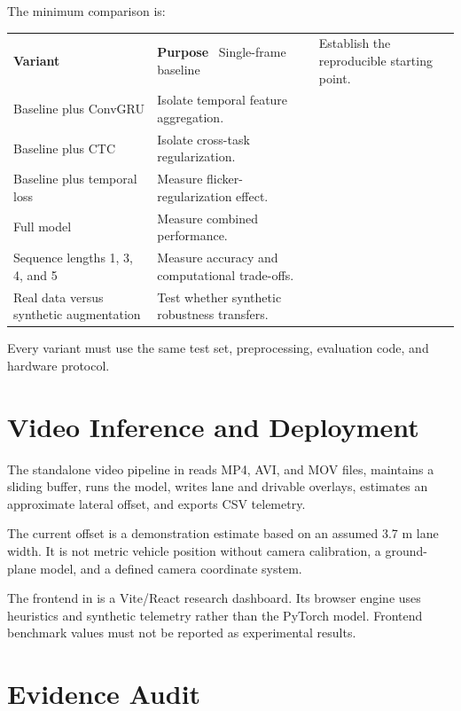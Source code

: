 \documentclass[11pt,a4paper]{article}
\begin{document}
The minimum comparison is:
\begin{longtable}{p{}p{}}
\toprule
\textbf{Variant} & \textbf{Purpose}\
\midrule
Single-frame baseline & Establish the reproducible starting point.\\
Baseline plus ConvGRU & Isolate temporal feature aggregation.\\
Baseline plus CTC & Isolate cross-task regularization.\\
Baseline plus temporal loss & Measure flicker-regularization effect.\\
Full model & Measure combined performance.\\
Sequence lengths 1, 3, 4, and 5 & Measure accuracy and computational trade-offs.\\
Real data versus synthetic augmentation & Test whether synthetic robustness transfers.\\
\bottomrule
\end{longtable}

Every variant must use the same test set, preprocessing, evaluation code, and hardware protocol.

\section{Video Inference and Deployment}

The standalone video pipeline in  reads MP4, AVI, and MOV files, maintains a sliding buffer, runs the model, writes lane and drivable overlays, estimates an approximate lateral offset, and exports CSV telemetry.

The current offset is a demonstration estimate based on an assumed 3.7 m lane width. It is not metric vehicle position without camera calibration, a ground-plane model, and a defined camera coordinate system.

The frontend in  is a Vite/React research dashboard. Its browser engine uses heuristics and synthetic telemetry rather than the PyTorch model. Frontend benchmark values must not be reported as experimental results.

\section{Evidence Audit}
\end{document}

